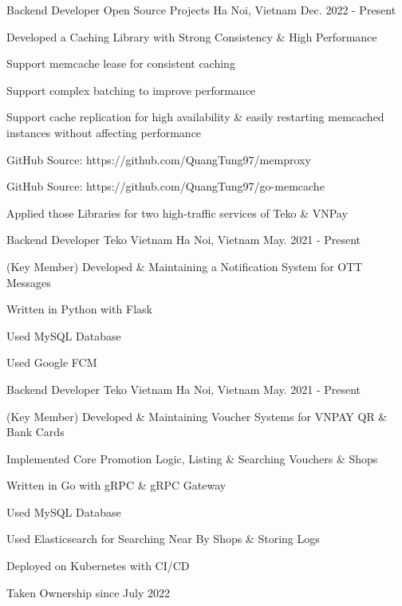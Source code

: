 \begin{cventries}
\cventry
{Backend Developer} %
{Open Source Projects} %
{Ha Noi, Vietnam} %
{Dec. 2022 - Present} %
{ %
\begin{cvitems}
\item{Developed a Caching Library with Strong Consistency \& High Performance}
\item{Support memcache lease for consistent caching}
\item{Support complex batching to improve performance}
\item{Support cache replication for high availability \& easily restarting memcached instances without affecting performance}
\item{GitHub Source: https://github.com/QuangTung97/memproxy}
\item{GitHub Source: https://github.com/QuangTung97/go-memcache}
\item{Applied those Libraries for two high-traffic services of Teko \& VNPay}
\end{cvitems}
}


\cventry
{Backend Developer} %
{Teko Vietnam} %
{Ha Noi, Vietnam} %
{May. 2021 - Present} %
{ %
\begin{cvitems}
\item{(Key Member) Developed \& Maintaining a Notification System for OTT Messages}
\item{Written in Python with Flask}
\item{Used MySQL Database}
\item{Used Google FCM}
\end{cvitems}
}


\cventry
{Backend Developer} %
{Teko Vietnam} %
{Ha Noi, Vietnam} %
{May. 2021 - Present} %
{ %
\begin{cvitems}
\item{(Key Member) Developed \& Maintaining Voucher Systems for VNPAY QR \& Bank Cards}
\item{Implemented Core Promotion Logic, Listing \& Searching Vouchers \& Shops}
\item{Written in Go with gRPC \& gRPC Gateway}
\item{Used MySQL Database}
\item{Used Elasticsearch for Searching Near By Shops \& Storing Logs}
\item{Deployed on Kubernetes with CI/CD}
\item{Taken Ownership since July 2022}
\end{cvitems}
}


\end{cventries}
